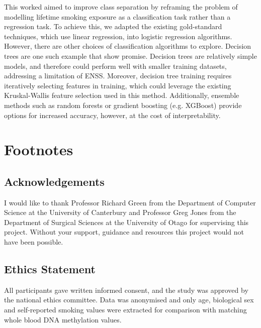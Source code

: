 \documentclass[draft]{article} %
\begin{document}
This worked aimed to improve class separation by reframing the problem of modelling lifetime smoking exposure as a classification task rather than a regression task. To achieve this, we adapted the existing gold-standard techniques, which use linear regression, into logistic regression algorithms. However, there are other choices of classification algorithms to explore. Decision trees are one such example that show promise. Decision trees are relatively simple models, and therefore could perform well with smaller training datasets, addressing a limitation of ENSS. Moreover, decision tree training requires iteratively selecting features in training, which could leverage the existing Kruskal-Wallis feature selection used in this method. Additionally, ensemble methods such as random forests or gradient boosting (e.g. XGBoost) provide options for increased accuracy, however, at the cost of interpretability.

\section{Footnotes}
\subsection{Acknowledgements}
I would like to thank Professor Richard Green from the Department of Computer Science at the University of Canterbury and Professor Greg Jones from the Department of Surgical Sciences at the University of Otago for supervising this project. Without your support, guidance and resources this project would not have been possible. 


\subsection{Ethics Statement}
All participants gave written informed consent, and the study was approved by the national ethics committee. Data was anonymised and only age, biological sex and self-reported smoking values were extracted for comparison with matching whole blood DNA methylation values.

\printbibliography
\end{document}
